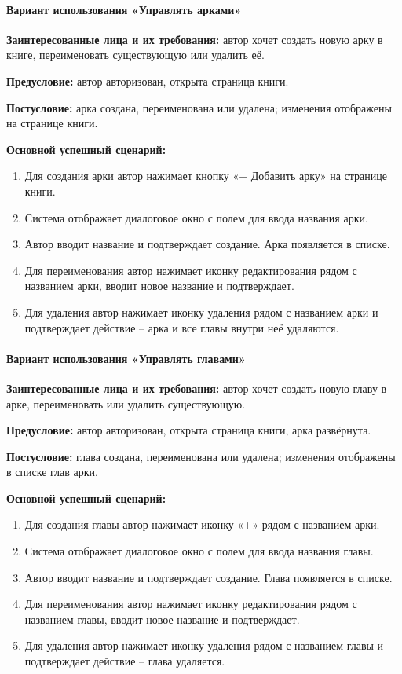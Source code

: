 \paragraph{Вариант использования «Управлять арками»}

\textbf{Заинтересованные лица и их требования:} автор хочет создать новую арку в книге, переименовать существующую или удалить её.

\textbf{Предусловие:} автор авторизован, открыта страница книги.

\textbf{Постусловие:} арка создана, переименована или удалена; изменения отображены на странице книги.

\textbf{Основной успешный сценарий:}
\begin{enumerate}
    \item Для создания арки автор нажимает кнопку «+ Добавить арку» на странице книги.
    \item Система отображает диалоговое окно с полем для ввода названия арки.
    \item Автор вводит название и подтверждает создание. Арка появляется в списке.
    \item Для переименования автор нажимает иконку редактирования рядом с названием арки, вводит новое название и подтверждает.
    \item Для удаления автор нажимает иконку удаления рядом с названием арки и подтверждает действие -- арка и все главы внутри неё удаляются.
\end{enumerate}

\paragraph{Вариант использования «Управлять главами»}

\textbf{Заинтересованные лица и их требования:} автор хочет создать новую главу в арке, переименовать или удалить существующую.

\textbf{Предусловие:} автор авторизован, открыта страница книги, арка развёрнута.

\textbf{Постусловие:} глава создана, переименована или удалена; изменения отображены в списке глав арки.

\textbf{Основной успешный сценарий:}
\begin{enumerate}
    \item Для создания главы автор нажимает иконку «+» рядом с названием арки.
    \item Система отображает диалоговое окно с полем для ввода названия главы.
    \item Автор вводит название и подтверждает создание. Глава появляется в списке.
    \item Для переименования автор нажимает иконку редактирования рядом с названием главы, вводит новое название и подтверждает.
    \item Для удаления автор нажимает иконку удаления рядом с названием главы и подтверждает действие -- глава удаляется.
\end{enumerate}

